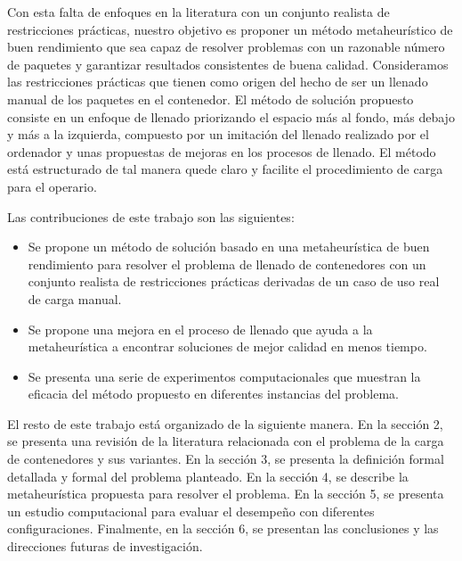 \documentclass[openany]{article}
\begin{document}
Con esta falta de enfoques en la literatura con un conjunto realista de restricciones prácticas, nuestro objetivo es proponer un método metaheurístico de buen rendimiento que sea capaz de resolver problemas con un razonable número de paquetes y garantizar resultados consistentes de buena calidad. Consideramos las restricciones prácticas que tienen como origen del hecho de ser un llenado manual de los paquetes en el contenedor. El método de solución propuesto consiste en un enfoque de llenado priorizando el espacio más al fondo, más debajo y más a la izquierda, compuesto por un imitación del llenado realizado por el ordenador y unas propuestas de mejoras en los procesos de llenado. El método está estructurado de tal manera quede claro y facilite el procedimiento de carga para el operario.

Las contribuciones de este trabajo son las siguientes:

\begin{itemize}
    \item Se propone un método de solución basado en una metaheurística de buen rendimiento para resolver el problema de llenado de contenedores con un conjunto realista de restricciones prácticas derivadas de un caso de uso real de carga manual.
    \item Se propone una mejora en el proceso de llenado que ayuda a la metaheurística a encontrar soluciones de mejor calidad en menos tiempo.
    \item Se presenta una serie de experimentos computacionales que muestran la eficacia del método propuesto en diferentes instancias del problema.
\end{itemize}

El resto de este trabajo está organizado de la siguiente manera. En la sección 2, se presenta una revisión de la literatura relacionada con el problema de la carga de contenedores y sus variantes. En la sección 3, se presenta la definición formal detallada y formal del problema planteado. En la sección 4, se describe la metaheurística propuesta para resolver el problema. En la sección 5, se presenta un estudio computacional para evaluar el desempeño con diferentes configuraciones. Finalmente, en la sección 6, se presentan las conclusiones y las direcciones futuras de investigación.





\newpage






\end{document}
